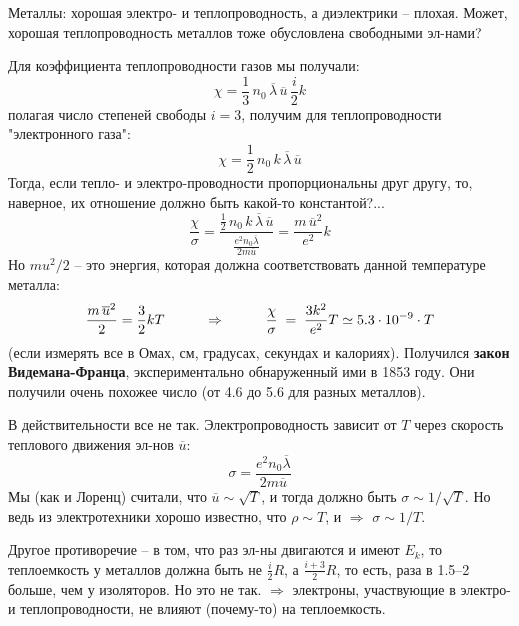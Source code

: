 Металлы: хорошая электро- и теплопроводность, а диэлектрики -- плохая. Может, хорошая тепло\-про\-вод\-ность металлов тоже обусловлена свободными эл-нами?

Для коэффициента теплопроводности газов мы получали:
 \begin{displaymath}
\chi =\frac13\,n_0\,\overline{\lambda}\,\overline{u}\,\frac{i}2k
 \end{displaymath}
полагая число степеней свободы $i=3$, получим для теплопроводности "электронного газа":
 \begin{displaymath}
\chi =\frac12\,n_0\,k\,\overline{\lambda}\,\overline{u}
 \end{displaymath}
Тогда, если тепло- и электро-проводности пропорциональны друг другу, то, наверное, их отношение должно быть какой-то константой?...
 \begin{displaymath}
\frac{\chi}{\sigma} =\frac{\frac12\,n_0\,k\,\overline{\lambda}\,\overline{u}}{\frac{e^2n_0\overline{\lambda}}{2m\overline{u}}}=
\frac{m\,\overline{u}^2}{e^2}k
 \end{displaymath}
 Но $mu^2/2$ -- это энергия, которая должна соответствовать данной температуре металла:
 \begin{displaymath}
\frac{m\,\overline{u}^2}2=\frac32kT\hspace{10mm}\Rightarrow\hspace{10mm}
\frac{\chi}{\sigma}\;=\; \frac{3k^2}{e^2}T \simeq 5.3\cdot10^{-9}\cdot T
 \end{displaymath}
(если измерять все в Омах, см, градусах, секундах и калориях). Получился {\bf закон Видемана-Франца}, экспериментально обнаруженный ими в 1853 году. Они получили очень похожее число (от 4.6 до 5.6 для разных металлов).

В действительности все не так.  Электропроводность зависит от  $T$ через скорость теплового движения эл-нов $\overline{u}$:
 \begin{displaymath}
\sigma= \frac{e^2n_0\overline{\lambda}}{2m\overline{u}}
 \end{displaymath}
 Мы (как и Лоренц) считали, что $\overline{u}\sim \sqrt{T}$, и тогда должно быть $\sigma\sim1/\sqrt{T}$. Но ведь из электротехники хорошо известно, что $\rho\sim T$, и $\Rightarrow$ $\sigma\sim1/T$.

Другое противоречие -- в том, что раз эл-ны двигаются и имеют $E_k$, то теплоемкость у металлов должна быть не $\frac{i}{2}R$, а $\frac{i+3}{2}R$, то есть, раза в 1.5--2 больше, чем у изоляторов. Но это не так.  $\Rightarrow$ электроны, участвующие в электро- и теплопроводности, не влияют (почему-то) на теплоемкость.

